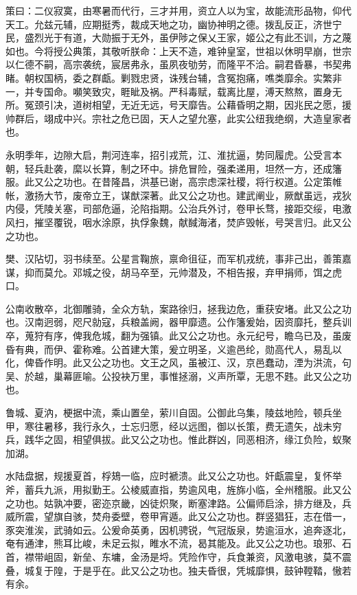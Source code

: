 \documentclass[12pt,UTF8]{ctexbook}
\begin{document}
策曰：二仪寂寞，由寒暑而代行，三才并用，资立人以为宝，故能流形品物，仰代天工。允兹元辅，应期挺秀，裁成天地之功，幽协神明之德。拨乱反正，济世宁民，盛烈光于有道，大勋振于无外，虽伊陟之保乂王家，姬公之有此丕训，方之蔑如也。今将授公典策，其敬听朕命：上天不造，难钟皇室，世祖以休明早崩，世宗以仁德不嗣，高宗袭统，宸居弗永，虽夙夜劬劳，而隆平不洽。嗣君昏暴，书契弗睹。朝权国柄，委之群甗。剿戮忠贤，诛残台辅，含冤抱痛，噍类靡余。实繁非一，并专国命。嚬笑致灾，睚眦及祸。严科毒赋，载离比屋，溥天熬熬，置身无所。冤颈引决，道树相望，无近无远，号天靡告。公藉昏明之期，因兆民之愿，援帅群后，翊成中兴。宗社之危已固，天人之望允塞，此实公纽我绝纲，大造皇家者也。

永明季年，边隙大启，荆河连率，招引戎荒，江、淮扰逼，势同履虎。公受言本朝，轻兵赴袭，縻以长算，制之环中。排危冒险，强柔递用，坦然一方，还成籓服。此又公之功也。在昔隆昌，洪基已谢，高宗虑深社稷，将行权道。公定策帷帐，激扬大节，废帝立王，谋猷深著。此又公之功也。建武阐业，厥猷虽远，戎狄内侵，凭陵关塞，司部危逼，沦陷指期。公治兵外讨，卷甲长骛，接距交绥，电激风扫，摧坚覆锐，咽水涂原，执俘象魏，献馘海渚，焚庐毁帐，号哭言归。此又公之功也。

樊、汉阽切，羽书续至。公星言鞠旅，禀命徂征，而军机戎统，事非己出，善策嘉谋，抑而莫允。邓城之役，胡马卒至，元帅潜及，不相告报，弃甲捐师，饵之虎口。

公南收散卒，北御雕骑，全众方轨，案路徐归，拯我边危，重获安堵。此又公之功也。汉南迥弱，咫尺勍寇，兵粮盖阙，器甲靡遗。公作籓爰始，因资靡托，整兵训卒，蒐狩有序，俾我危城，翻为强镇。此又公之功也。永元纪号，瞻乌已及，虽废昏有典，而伊、霍称难。公首建大策，爰立明圣，义逾邑纶，勋高代人，易乱以化，俾昏作明。此又公之功也。文王之风，虽被江、汉，京邑蠢动，湮为洪流，句吴、於越，巢幕匪喻。公投袂万里，事惟拯溺，义声所覃，无思不韪。此又公之功也。

鲁城、夏汭，梗据中流，乘山置垒，萦川自固。公御此乌集，陵兹地险，顿兵坐甲，寒往暑移，我行永久，士忘归愿，经以远图，御以长策，费无遗矢，战未穷兵，践华之固，相望俱拔。此又公之功也。惟此群凶，同恶相济，缘江负险，蚁聚加湖。

水陆盘据，规援夏首，桴鳷一临，应时褫溃。此又公之功也。奸甗震皇，复怀举斧，蓄兵九派，用拟勤王。公棱威直指，势逾风电，旌旆小临，全州稽服。此又公之功也。姑孰冲要，密迩京畿，凶徒炽聚，断塞津路。公偏师启涂，排方继及，兵威所震，望旗自骇，焚舟委壁，卷甲宵遁。此又公之功也。群竖猖狂，志在借一，豕突淮涘，武骑如云。公爰命英勇，因机骋锐，气冠版泉，势逾洹水，追奔逐北，奄有通津，熊耳比峻，未足云拟，睢水不流，曷其能及。此又公之功也。琅邪、石首，襟带岨固，新垒、东墉，金汤是埒。凭险作守，兵食兼资，风激电骇，莫不震叠，城复于隍，于是乎在。此又公之功也。独夫昏很，凭城靡惧，鼓钟鞺鞜，慠若有余。
\end{document}
